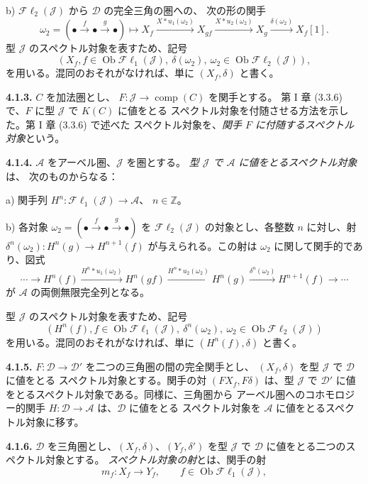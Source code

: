 \clearpage
{}%
\begingroup\small\setlength{\parskip}{0pt}\setlength{\emergencystretch}{1.5em}
b) $\mathcal{F}\ell_2(\mathcal J)$ から $\mathcal D$ の完全三角の圏への、
次の形の関手
\[
\omega_2=(\mathord\bullet\xrightarrow f\mathord\bullet\xrightarrow g\mathord\bullet)
\longmapsto
X_f\xrightarrow{X*u_1(\omega_2)}X_{gf}
\xrightarrow{X*u_2(\omega_2)}X_g
\xrightarrow{\delta(\omega_2)}X_f[1].
\]
型 $\mathcal J$ のスペクトル対象を表すため、記号
\[
(X_f, f\in\operatorname{Ob}\mathcal{F}\ell_1(\mathcal J),\
\delta(\omega_2),
\ \omega_2\in\operatorname{Ob}\mathcal{F}\ell_2(\mathcal J)),
\]
を用いる。混同のおそれがなければ、単に $(X_f,\delta)$ と書く。

\medskip\noindent\textbf{4.1.3.}\quad
$C$ を加法圏とし、
$F\colon\mathcal J\longrightarrow\operatorname{comp}(C)$ を関手とする。
第 I 章 (3.3.6) で、$F$ に型 $\mathcal J$ で $K(C)$ に値をとる
スペクトル対象を付随させる方法を示した。第 I 章 (3.3.6) で述べた
スペクトル対象を、\emph{関手 $F$ に付随するスペクトル対象}という。

\medskip\noindent\textbf{4.1.4.}\quad
$\mathcal A$ をアーベル圏、$\mathcal J$ を圏とする。
\emph{型 $\mathcal J$ で $\mathcal A$ に値をとるスペクトル対象}は、
次のものからなる：

a) 関手列
$H^n\colon\mathcal{F}\ell_1(\mathcal J)\longrightarrow\mathcal A$、
$n\in\mathbb Z$。

b) 各対象
$\omega_2=(\mathord\bullet\xrightarrow f\mathord\bullet\xrightarrow g\mathord\bullet)$
を $\mathcal{F}\ell_2(\mathcal J)$ の対象とし、各整数 $n$ に対し、射
$\delta^n(\omega_2)\colon H^n(g)\to H^{n+1}(f)$ が与えられる。この射は
$\omega_2$ に関して関手的であり、図式
\[
\cdots\longrightarrow H^n(f)
\xrightarrow{H^n*u_1(\omega_2)}H^n(gf)
\xrightarrow{H^n*u_2(\omega_2)}H^n(g)
\xrightarrow{\delta^n(\omega_2)}H^{n+1}(f)
\longrightarrow\cdots
\]
が $\mathcal A$ の両側無限完全列となる。

型 $\mathcal J$ のスペクトル対象を表すため、記号
\[
(H^n(f), f\in\operatorname{Ob}\mathcal{F}\ell_1(\mathcal J),\
\delta^n(\omega_2),
\ \omega_2\in\operatorname{Ob}\mathcal{F}\ell_2(\mathcal J))
\]
を用いる。混同のおそれがなければ、単に $(H^n(f),\delta)$ と書く。

\medskip\noindent\textbf{4.1.5.}\quad
$F\colon\mathcal D\to\mathcal D'$ を二つの三角圏の間の完全関手とし、
$(X_f,\delta)$ を型 $\mathcal J$ で $\mathcal D$ に値をとる
スペクトル対象とする。関手の対 $(FX_f,F\delta)$ は、型 $\mathcal J$ で
$\mathcal D'$ に値をとるスペクトル対象である。同様に、三角圏から
アーベル圏へのコホモロジー的関手
$H\colon\mathcal D\to\mathcal A$ は、$\mathcal D$ に値をとる
スペクトル対象を $\mathcal A$ に値をとるスペクトル対象に移す。

\medskip\noindent\textbf{4.1.6.}\quad
$\mathcal D$ を三角圏とし、$(X_f,\delta)$、$(Y_f,\delta')$ を型
$\mathcal J$ で $\mathcal D$ に値をとる二つのスペクトル対象とする。
\emph{スペクトル対象の射}とは、関手の射
\[
m_f\colon X_f\longrightarrow Y_f,\qquad
f\in\operatorname{Ob}\mathcal{F}\ell_1(\mathcal J),
\]
\endgroup
